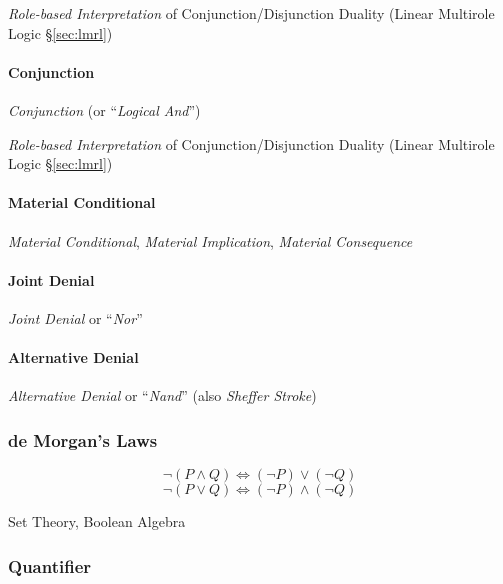 \fist \emph{Role-based Interpretation} of Conjunction/Disjunction
Duality (Linear Multirole Logic \S\ref{sec:lmrl})



\paragraph{Conjunction}\label{sec:conjunction}\hfill

\emph{Conjunction} (or ``\emph{Logical And}'')

\fist \emph{Role-based Interpretation} of Conjunction/Disjunction
Duality (Linear Multirole Logic \S\ref{sec:lmrl})



\paragraph{Material Conditional}\label{sec:material_conditional}\hfill

\emph{Material Conditional}, \emph{Material Implication},
\emph{Material Consequence}



\paragraph{Joint Denial}\label{sec:joint_denial}\hfill

\emph{Joint Denial} or ``\emph{Nor}''



\paragraph{Alternative Denial}\label{sec:alternative_denial}\hfill

\emph{Alternative Denial} or ``\emph{Nand}'' (also \emph{Sheffer
  Stroke})



\subsubsection{de Morgan's Laws}\label{sec:de_morgan}

\[
  \neg (P \wedge Q) \Leftrightarrow (\neg P) \vee (\neg Q)
\] \[
  \neg (P \vee Q) \Leftrightarrow (\neg P) \wedge (\neg Q)
\]

Set Theory, Boolean Algebra



\subsubsection{Quantifier}\label{sec:quantifier}


